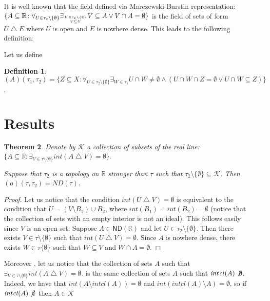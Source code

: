 \documentclass[12pt]{amsart}
\theoremstyle{plain}
\newtheorem{theorem}{Theorem}[section]
\theoremstyle{definition}
\newtheorem{definition}[theorem]{Definition}
\theoremstyle{remark}
\newcommand{\cl}{\mathit{cl}}
\newcommand{\real}{\mathbb{R}}
\newcommand{\cK}{{\mathcal K}}
\newcommand{\mathint}{\mathit{int}}
\newcommand{\aideal}{\mathit{(a)}}
\begin{document}
It is well known that the field defined via
Marczewski-Burstin representation:
$\lbrace A \subseteq \real\colon 
\forall_{U \in \tau_e \setminus \lbrace \emptyset \rbrace}
\exists_{V \in \tau_e \setminus \lbrace \emptyset \rbrace \atop V \subseteq U}
V \subseteq A \vee V \cap A = \emptyset\rbrace$
is the field of sets of form $U \bigtriangleup E$
where $U$ is open and $E$ is nowhere dense.
This leads to the following definition:

Let us define 
\begin{definition}
$(A)(\tau_1, \tau_2) = \{ Z \subseteq X \colon
\forall_{U \in \tau_2 \setminus \{ \emptyset\}}
\exists_{W \in \tau_1} U \cap W \not= \emptyset \wedge
(U \cap W \cap Z = \emptyset \vee U \cap W \subseteq Z)\}$.
\end{definition}

\section{Results}

\begin{theorem}
Denote by $\cK$ a collection of subsets of the real line:
$\lbrace A \subseteq \real \colon 
\exists_{V\in\tau\setminus\lbrace\emptyset\rbrace}  
\mathint (A \bigtriangleup V) = \emptyset\rbrace$.

Suppose that $\tau_2$ is a topology on $\real$ stronger than $\tau$ 
such that 
$\tau_2\setminus\lbrace \emptyset \rbrace \subseteq \cK$.
Then $\aideal(\tau, \tau_2) = ND(\tau)$.
\end{theorem}
									
\begin{proof}  
Let us notice that the condition $\mathint (U \bigtriangleup V) = \emptyset$
is equivalent to the condition that $U = (V \setminus B_1) \cup B_2$,
where $\mathint(B_1) = \mathint(B_2) = \emptyset$ (notice that the 
collection of sets with an empty interior is not an ideal).
This follows easily since $V$ is an open set.
Suppose $A \in \mathsf{ND}(\real)$ and let $U \in \tau_2\setminus\lbrace \emptyset \rbrace$.
Then there exists $V\in\tau\setminus\lbrace\emptyset\rbrace$ such that
$\mathint (U \bigtriangleup V) = \emptyset$. Since $A$ is nowhere dense, there
exists $W \in \tau\lbrace\emptyset\rbrace$ such that
$W \subseteq V$ and $W \cap A = \emptyset$.  

\end{proof}
Moreover , let us notice that the collection of sets $A$ such that 
$\exists_{V\in\tau\setminus\lbrace\emptyset\rbrace}  \mathint (A \bigtriangleup V) = \emptyset$.
is the same collection of sets $A$ such that $\mathint\cl(A) \not\emptyset$. 
Indeed, we have that $\mathint(A \setminus \mathint\cl(A)) = \emptyset$
and 
$\mathint(\mathint\cl(A) \setminus A) = \emptyset$, so 
if $\mathint\cl(A) \not\emptyset$ then $A\in \cK$ 
\end{document}

